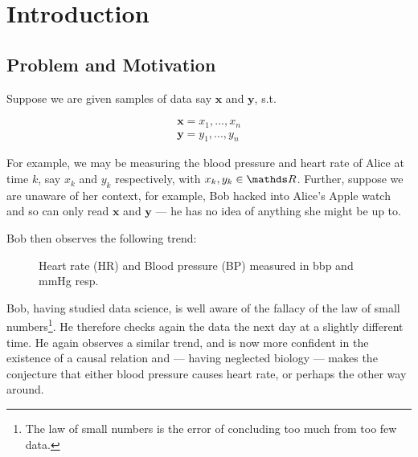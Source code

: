 
\chapter{Introduction}

\section{Problem and Motivation}

Suppose we are given samples of data say $\mathbf{x}$ and $\mathbf{y}$, s.t.

\begin{align*}
    \mathbf{x} = x_1, ..., x_n  \\
    \mathbf{y} = y_1, ..., y_n 
\end{align*}

For example, we may be measuring the blood pressure and heart rate of Alice at time $k$, 
say $x_k$ and $y_k$ respectively, with $x_k, y_k \in \R$. Further, suppose we are unaware of her context, for example,
Bob hacked into Alice's Apple watch and so can only read $\mathbf{x}$ and $\mathbf{y}$ --- he has no idea of 
anything she might be up to.

Bob then observes the following trend:

\begin{figure}[htb]
    \centering
    \caption{Heart rate (HR) and Blood pressure (BP) measured in bbp and mmHg resp.}
\end{figure}

Bob, having studied data science, is well aware of the fallacy of the law of small numbers\footnote{
    The law of small numbers is the error of concluding too much from too few data. 
}. He therefore checks again the data the next day at a slightly different time. He again observes 
a similar trend, and is now more confident in the existence of a causal relation and --- having neglected biology --- 
makes the conjecture that either blood pressure causes heart rate, or 
perhaps the other way around. 

